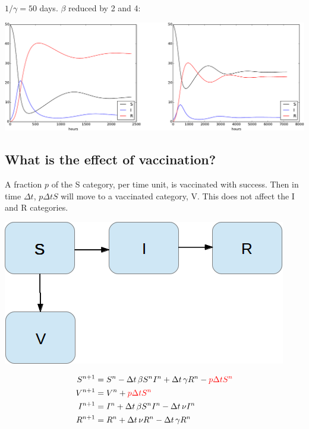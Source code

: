 \documentclass[%
twoside,                 %
final,                   %
10pt]{article}
\newenvironment{block_mdfboxadmon}[1][]{
\begin{block_mdfboxmdframed}[frametitle=#1]
}
{
\end{block_mdfboxmdframed}
}
\begin{document}
$1/\gamma = 50$ days. $\beta$ reduced by 2 and 4:


\begin{center}  %
  \centerline{\includegraphics[width=0.9\linewidth]{fig/SIR2.pdf}}
\end{center}


\subsection{What is the effect of vaccination?}


\begin{block_mdfboxadmon}[Assumptions.]
A fraction $p$ of the S category, per time unit, is vaccinated with
success. Then in time $\Delta t$, $p\Delta t S$ will move to a
vaccinated category, V. This does not affect the I and R categories.
\end{block_mdfboxadmon}




\begin{center}  %
  \centerline{\includegraphics[width=0.4\linewidth]{fig/categories_SIRV.png}}
\end{center}


\begin{align}
S^{n+1} &= S^n - \Delta t\,\beta S^nI^n + \Delta t\,\gamma R^n - \color{red}{p\Delta t S^n}
\label{SIR3:S}\\
V^{n+1} &= V^n + \color{red}{p\Delta t S^n}
\label{SIR3:V}\\
I^{n+1} &= I^n + \Delta t\,\beta S^nI^n -\Delta t\,\nu I^n
\label{SIR3:I}\\
R^{n+1} &= R^n + \Delta t\,\nu R^n - \Delta t\,\gamma R^n
\label{SIR3:R}
\end{align}
\end{document}
